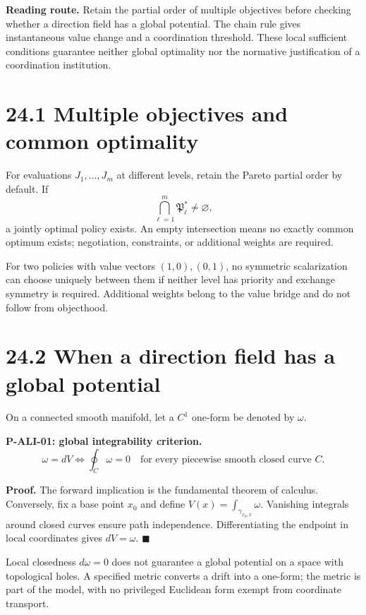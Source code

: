 \documentclass[
  english,
  11pt,
  oneside]{book}
\begin{document}
\textbf{Reading route.} Retain the partial order of multiple objectives before checking whether a direction field has a global potential. The chain rule gives instantaneous value change and a coordination threshold. These local sufficient conditions guarantee neither global optimality nor the normative justification of a coordination institution.

\section{24.1 Multiple objectives and common optimality}\label{multiple-objectives-and-common-optimality}

For evaluations \(J_1,\ldots,J_m\) at different levels, retain the Pareto partial order by default. If \[\bigcap_{\ell=1}^m\mathfrak P_\ell^*\ne\varnothing,\] a jointly optimal policy exists. An empty intersection means no exactly common optimum exists; negotiation, constraints, or additional weights are required.

For two policies with value vectors \((1,0),(0,1)\), no symmetric scalarization can choose uniquely between them if neither level has priority and exchange symmetry is required. Additional weights belong to the value bridge and do not follow from objecthood.

\section{24.2 When a direction field has a global potential}\label{when-a-direction-field-has-a-global-potential}

On a connected smooth manifold, let a \(C^1\) one-form be denoted by \(\omega\).

\hypertarget{p-ali-01}{}\label{p-ali-01}

\textbf{P-ALI-01: global integrability criterion.} \[\omega=dV
\iff
\oint_C\omega=0
\quad\text{for every piecewise smooth closed curve }C.\]

\textbf{Proof.} The forward implication is the fundamental theorem of calculus. Conversely, fix a base point \(x_0\) and define \(V(x)=\int_{\gamma_{x_0,x}}\omega\). Vanishing integrals around closed curves ensure path independence. Differentiating the endpoint in local coordinates gives \(dV=\omega\). \(\blacksquare\)

Local closedness \(d\omega=0\) does not guarantee a global potential on a space with topological holes. A specified metric converts a drift into a one-form; the metric is part of the model, with no privileged Euclidean form exempt from coordinate transport.
\end{document}

